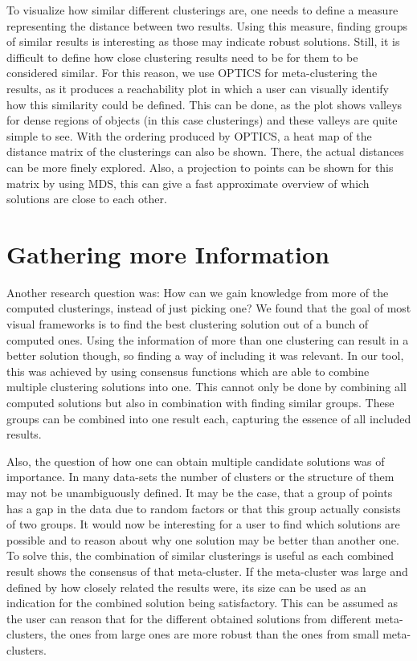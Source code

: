 \documentclass[
	a4paper,
	english,
	twoside,
	openright,               
	11pt                            
	]{report}
\begin{document}
To visualize how similar different clusterings are, one needs to define a measure representing the distance between two results. Using this measure, finding groups of similar results is interesting as those may indicate robust solutions. Still, it is difficult to define how close clustering results need to be for them to be considered similar. For this reason, we use OPTICS for meta-clustering the results, as it produces a reachability plot in which a user can visually identify how this similarity could be defined. This can be done, as the plot shows valleys for dense regions of objects (in this case clusterings) and these valleys are quite simple to see. With the ordering produced by OPTICS, a heat map of the distance matrix of the clusterings can also be shown. There, the actual distances can be more finely explored. Also, a projection to points can be shown for this matrix by using MDS, this can give a fast approximate overview of which solutions are close to each other.

\section{Gathering more Information}
Another research question was: How can we gain knowledge from more of the computed clusterings, instead of just picking one? We found that the goal of most visual frameworks is to find the best clustering solution out of a bunch of computed ones. Using the information of more than one clustering can result in a better solution though, so finding a way of including it was relevant. In our tool, this was achieved by using consensus functions which are able to combine multiple clustering solutions into one. This cannot only be done by combining all computed solutions but also in combination with finding similar groups. These groups can be combined into one result each, capturing the essence of all included results.

Also, the question of how one can obtain multiple candidate solutions was of importance. In many data-sets the number of clusters or the structure of them may not be unambiguously defined. It may be the case, that a group of points has a gap in the data due to random factors or that this group actually consists of two groups. It would now be interesting for a user to find which solutions are possible and to reason about why one solution may be better than another one. To solve this, the combination of similar clusterings is useful as each combined result shows the consensus of that meta-cluster. If the meta-cluster was large and defined by how closely related the results were, its size can be used as an indication for the combined solution being satisfactory. This can be assumed as the user can reason that for the different obtained solutions from different meta-clusters, the ones from large ones are more robust than the ones from small meta-clusters.
\end{document}
